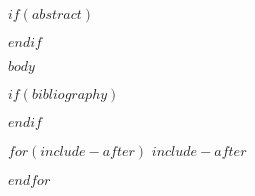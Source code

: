 \documentclass[$for(classoption)$$classoption$$sep$,$endfor$,$bibliographystyle$]{crumpet}
\begin{document}






$if(abstract)$
\begin{abstract}
$abstract$
\end{abstract}
$endif$


\tableofcontents




$body$

$if(bibliography)$


$endif$

$for(include-after)$
$include-after$

$endfor$
\end{document}
